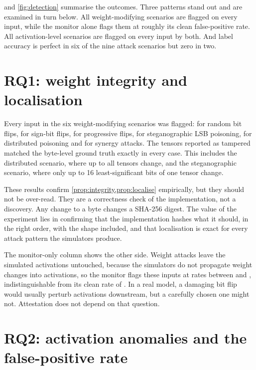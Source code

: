  and \cref{fig:detection} summarise the outcomes. Three patterns stand out
and are examined in turn below. All weight-modifying scenarios are flagged on every input, while
the monitor alone flags them at roughly its clean false-positive rate. All activation-level
scenarios are flagged on every input by both. And label accuracy is perfect in six of the nine
attack scenarios but zero in two.

\section{RQ1: weight integrity and localisation}
\label{sec:eval:rq1}

Every input in the six weight-modifying scenarios was flagged: \FlagBfaRandom{} for random bit
flips, \FlagBfaSignBit{} for sign-bit flips, \FlagBfaProgressive{} for progressive flips,
\FlagSupplySteg{} for steganographic LSB poisoning, \FlagSupplyDistributed{} for distributed
poisoning and \FlagSynergy{} for synergy attacks. The tensors reported as tampered matched the
byte-level ground truth exactly in every case. This includes the distributed scenario, where up
to all \TinyLayers{} tensors change, and the steganographic scenario, where only up to 16
least-significant bits of one tensor change.

These results confirm \cref{prop:integrity,prop:localise} empirically, but they should not be
over-read. They are a correctness check of the implementation, not a discovery. Any change to a
byte changes a SHA-256 digest. The value of the experiment lies in confirming that the
implementation hashes what it should, in the right order, with the shape included, and that
localisation is exact for every attack pattern the simulators produce.

The monitor-only column shows the other side. Weight attacks leave the simulated activations
untouched, because the simulators do not propagate weight changes into activations, so the
monitor flags these inputs at rates between \MonSupplySteg{} and \MonBfaRandom{},
indistinguishable from its clean rate of \MonClean{}. In a real model, a damaging bit flip would usually perturb activations
downstream, but a carefully chosen one might not. Attestation does not depend on that question.

\section{RQ2: activation anomalies and the false-positive rate}
\label{sec:eval:fpr}


